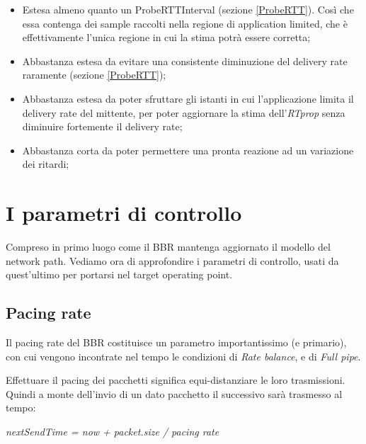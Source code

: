 \begin{itemize}

\item Estesa almeno quanto un ProbeRTTInterval (sezione \ref{ProbeRTT}). Così che essa contenga dei sample raccolti nella regione di application limited, che è effettivamente l'unica regione in cui la stima potrà essere corretta;

\item Abbastanza estesa da evitare una consistente diminuzione del delivery rate raramente (sezione \ref{ProbeRTT});

\item Abbastanza estesa da poter sfruttare gli istanti in cui l'applicazione limita il delivery rate del mittente, per poter aggiornare la stima dell'\textit{RTprop} senza diminuire fortemente il delivery rate;

\item Abbastanza corta da poter permettere una pronta reazione ad un variazione dei ritardi;

\end{itemize}

\section{I parametri di controllo}

Compreso in primo luogo come il BBR mantenga aggiornato il modello del network path. Vediamo ora di approfondire i parametri di controllo, usati da quest'ultimo per portarsi nel target operating point.

\subsection{Pacing rate}

Il pacing rate del BBR costituisce un parametro importantissimo (e primario), con cui vengono incontrate nel tempo le condizioni di \textit{Rate balance}, e di \textit{Full pipe}. \bigskip

Effettuare il pacing dei pacchetti significa equi-distanziare le loro trasmissioni. Quindi a monte dell'invio di un dato pacchetto il successivo sarà trasmesso al tempo:

\begin{center}

\textit{nextSendTime = now + packet.size / pacing rate}

\end{center}

